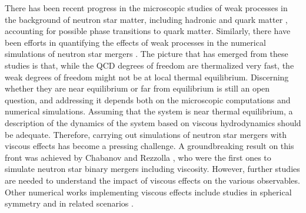 \documentclass[prd,aps,twocolumn,floats,floatfix,nofootinbib,superscriptaddress] {revtex4-1}
\begin{document}
There has been recent progress in the microscopic studies of
weak processes in the background of neutron star matter, including hadronic \cite{Alford:2020lla,Alford:2021ogv,Alford:2022ufz} and quark matter \cite{Hernandez:2024rxi}, accounting for possible phase transitions to quark matter. 
%
Similarly, there have been efforts in quantifying the effects of weak processes in the numerical simulations of neutron star mergers \cite{Most:2021zvc,Most:2022yhe,Radice:2021jtw}. 
%
The picture that has emerged from these studies is that, while the QCD degrees of freedom are thermalized very fast, the weak degrees of freedom 
might not be at local thermal equilibrium.
Discerning whether they are near equilibrium or far from equilibrium is still an open question, and addressing it depends both on the microscopic computations and numerical simulations.  Assuming that the system is near thermal equilibrium, a description of the dynamics of the system based on viscous hydrodynamics should be adequate. 
Therefore, carrying out simulations of neutron star mergers with viscous effects has become a pressing challenge.
A groundbreaking result on this front was achieved by Chabanov and Rezzolla \cite{Chabanov:2021dee,Chabanov:2023abq,Chabanov:2023blf}, who were the first ones to simulate neutron star binary mergers including viscosity. 
However, further studies are needed to understand the impact of viscous effects on the various observables.
Other numerical works implementing viscous effects include studies in spherical symmetry \cite{Camelio:2022fds} and in related scenarios \cite{Radice:2017zta,Shibata:2017jyf,Shibata:2017xht,Duez:2020lgq}.
\end{document}
